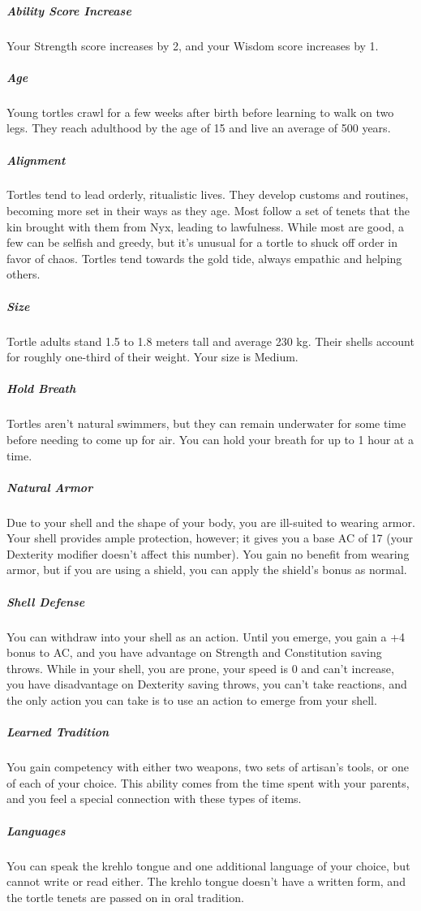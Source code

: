     \subparagraph{Ability Score Increase} Your Strength score increases by 2, and your Wisdom score increases by 1.

    \subparagraph{Age} Young tortles crawl for a few weeks after birth before learning to walk on two legs.
    They reach adulthood by the age of 15 and live an average of 500 years.

    \subparagraph{Alignment} Tortles tend to lead orderly, ritualistic lives.
    They develop customs and routines, becoming more set in their ways as they age.
    Most follow a set of tenets that the kin brought with them from Nyx, leading to lawfulness.
    While most are good, a few can be selfish and greedy, but it's unusual for a tortle to shuck off order in favor of chaos.
    Tortles tend towards the gold tide, always empathic and helping others.

    \subparagraph{Size} Tortle adults stand 1.5 to 1.8 meters tall and average 230 kg.
    Their shells account for roughly one-third of their weight.
    Your size is Medium.

    \subparagraph{Hold Breath} Tortles aren't natural swimmers, but they can remain underwater for some time before needing to come up for air.
    You can hold your breath for up to 1 hour at a time.

    \subparagraph{Natural Armor} Due to your shell and the shape of your body, you are ill-suited to wearing armor.
    Your shell provides ample protection, however; it gives you a base AC of 17 (your Dexterity modifier doesn't affect this number).
    You gain no benefit from wearing armor, but if you are using a shield, you can apply the shield's bonus as normal.

    \subparagraph{Shell Defense} You can withdraw into your shell as an action.
    Until you emerge, you gain a +4 bonus to AC, and you have advantage on Strength and Constitution saving throws.
    While in your shell, you are prone, your speed is 0 and can't increase, you have disadvantage on Dexterity saving throws, you can't take reactions, and the only action you can take is to use an action to emerge from your shell.


    \subparagraph{Learned Tradition} You gain competency with either two weapons, two sets of artisan's tools, or one of each of your choice.
    This ability comes from the time spent with your parents, and you feel a special connection with these types of items.

    \subparagraph{Languages} You can speak the krehlo tongue and one additional language of your choice, but cannot write or read either.
    The krehlo tongue doesn't have a written form, and the tortle tenets are passed on in oral tradition.

\newpage
